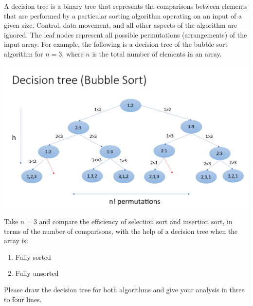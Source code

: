 \documentclass[a4paper]{exam}
\begin{document}
\begin{questions}
\question[1]
A decision tree is a binary tree that represents the comparisons between elements that are performed by a particular sorting algorithm operating on an input of a given size. Control, data movement, and all other aspects of the algorithm are ignored. The leaf nodes represent all possible permutations (arrangements) of the input array. For example, the following is a decision tree of the bubble sort algorithm for $n=3$, where $n$ is the total number of elements in an array.
\begin{center}
\includegraphics[scale=0.4]{wc02_image.png}    
\end{center}
Take $n=3$ and compare the efficiency of selection sort and insertion sort, in terms of the number of comparisons, with the help of a decision tree when the array is:
\begin{enumerate}
    \item Fully sorted
    \item Fully unsorted
\end{enumerate}

Please draw the decision tree for both algorithms and give your analysis in three to four lines.
\begin{solution}
    

\end{solution}
\end{questions}
\end{document}

